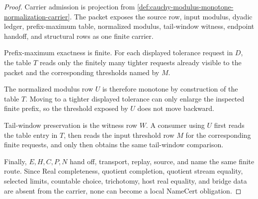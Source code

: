\begin{proof}
Carrier admission is projection from \autoref{def:cauchy-modulus-monotone-normalization-carrier}. The packet exposes the source row, input modulus, dyadic ledger, prefix-maximum table, normalized modulus, tail-window witness, endpoint handoff, and structural rows as one finite carrier.

Prefix-maximum exactness is finite. For each displayed tolerance request in $D$, the table $T$ reads only the finitely many tighter requests already visible to the packet and the corresponding thresholds named by $M$.

The normalized modulus row $U$ is therefore monotone by construction of the table $T$. Moving to a tighter displayed tolerance can only enlarge the inspected finite prefix, so the threshold exposed by $U$ does not move backward.

Tail-window preservation is the witness row $W$. A consumer using $U$ first reads the table entry in $T$, then reads the input threshold row $M$ for the corresponding finite requests, and only then obtains the same tail-window comparison.

Finally, $E,H,C,P,N$ hand off, transport, replay, source, and name the same finite route. Since Real completeness, quotient completion, quotient stream equality, selected limits, countable choice, trichotomy, host real equality, and bridge data are absent from the carrier, none can become a local NameCert obligation.
\end{proof}

